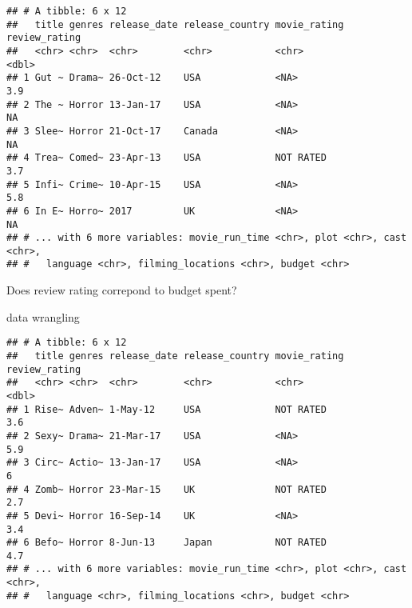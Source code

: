 \documentclass[]{article}
\newenvironment{Shaded}{\begin{snugshade}}{\end{snugshade}}
\newcommand{\KeywordTok}[1]{\textcolor[rgb]{0.13,0.29,0.53}{\textbf{#1}}}
\newcommand{\CharTok}[1]{\textcolor[rgb]{0.31,0.60,0.02}{#1}}
\newcommand{\StringTok}[1]{\textcolor[rgb]{0.31,0.60,0.02}{#1}}
\newcommand{\CommentTok}[1]{\textcolor[rgb]{0.56,0.35,0.01}{\textit{#1}}}
\newcommand{\OperatorTok}[1]{\textcolor[rgb]{0.81,0.36,0.00}{\textbf{#1}}}
\newcommand{\NormalTok}[1]{#1}
\begin{document}
\begin{verbatim}
## # A tibble: 6 x 12
##   title genres release_date release_country movie_rating review_rating
##   <chr> <chr>  <chr>        <chr>           <chr>                <dbl>
## 1 Gut ~ Drama~ 26-Oct-12    USA             <NA>                   3.9
## 2 The ~ Horror 13-Jan-17    USA             <NA>                  NA  
## 3 Slee~ Horror 21-Oct-17    Canada          <NA>                  NA  
## 4 Trea~ Comed~ 23-Apr-13    USA             NOT RATED              3.7
## 5 Infi~ Crime~ 10-Apr-15    USA             <NA>                   5.8
## 6 In E~ Horro~ 2017         UK              <NA>                  NA  
## # ... with 6 more variables: movie_run_time <chr>, plot <chr>, cast <chr>,
## #   language <chr>, filming_locations <chr>, budget <chr>
\end{verbatim}

Does review rating correpond to budget spent?

data wrangling

\begin{Shaded}
\end{Shaded}

\begin{verbatim}
## # A tibble: 6 x 12
##   title genres release_date release_country movie_rating review_rating
##   <chr> <chr>  <chr>        <chr>           <chr>                <dbl>
## 1 Rise~ Adven~ 1-May-12     USA             NOT RATED              3.6
## 2 Sexy~ Drama~ 21-Mar-17    USA             <NA>                   5.9
## 3 Circ~ Actio~ 13-Jan-17    USA             <NA>                   6  
## 4 Zomb~ Horror 23-Mar-15    UK              NOT RATED              2.7
## 5 Devi~ Horror 16-Sep-14    UK              <NA>                   3.4
## 6 Befo~ Horror 8-Jun-13     Japan           NOT RATED              4.7
## # ... with 6 more variables: movie_run_time <chr>, plot <chr>, cast <chr>,
## #   language <chr>, filming_locations <chr>, budget <chr>
\end{verbatim}

\begin{Shaded}
\end{Shaded}
\end{document}
